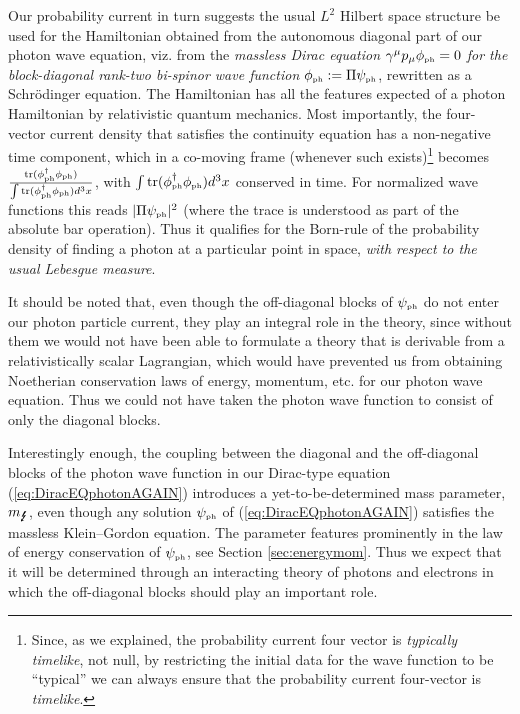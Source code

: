 \documentclass[11pt]{article}
\theoremstyle{definition}
\DeclareMathOperator{\tr}{tr}
\newcommand{\refeq}[1]{(\ref{#1})}
\numberwithin{equation}{section}
\newcommand{\psiPH}{{\psi_{\mbox{\rm\tiny ph}}}}
\newcommand{\phiPH}{{\phi_{\mbox{\rm\tiny ph}}}}
\newcommand{\mPH}{{m_{\mbox{\Lightning}}}}
\newcommand{\ga}{\gamma}
\begin{document}
 Our probability current in turn suggests the usual $L^2$ Hilbert space structure be used for the Hamiltonian obtained from the
autonomous diagonal part of our photon wave equation, viz. from the
\emph{massless Dirac equation $\ga^\mu p_\mu \phiPH = 0$ for the block-diagonal rank-two bi-spinor wave function} $\phiPH:= \Pi\psiPH$,
rewritten as a Schr\"odinger equation.
 The Hamiltonian has all the features expected of a photon Hamiltonian by relativistic quantum mechanics.
 Most importantly, the four-vector current density that satisfies the continuity equation has a non-negative time component,
which in a co-moving frame (whenever such exists)\footnote{Since, as we explained,
  the probability current four vector is \emph{typically timelike}, not null, by restricting the initial data for the 
  wave function to be ``typical'' we can always ensure that  the probability current four-vector is \emph{timelike}.}
becomes $\frac{\tr({\phi^\dagger_{\mbox{\rm\tiny ph}}} \phiPH)}{\int \tr({\phi^\dagger_{\mbox{\rm\tiny ph}}} \phiPH) d^3x}$, 
with $\int \tr({\phi^\dagger_{\mbox{\rm\tiny ph}}} \phiPH) d^3x$ conserved in time. 
 For normalized wave functions this reads $|\Pi\psiPH|^2$ (where the trace is understood as part of the absolute bar operation).
 Thus it qualifies for the Born-rule of the probability density of finding a photon at a particular point in space,
\emph{with respect to the usual Lebesgue measure}.

 It should be noted that, even though the off-diagonal blocks of $\psiPH$ do not enter our photon particle current, 
they play an integral role in the theory, since without them we would not have been able to formulate a theory that 
is derivable from a relativistically scalar Lagrangian, which would have prevented us from obtaining Noetherian 
conservation laws of energy, momentum, etc. for our photon wave equation. 
 Thus we could not have taken the photon wave function to consist of only the diagonal blocks. 

 Interestingly enough, the coupling between the diagonal and the off-diagonal blocks of the photon wave function
in our Dirac-type equation \refeq{eq:DiracEQphotonAGAIN} introduces a yet-to-be-determined mass parameter, $\mPH$, 
even though any solution $\psiPH$ of \refeq{eq:DiracEQphotonAGAIN} satisfies the massless Klein--Gordon equation. 
 The parameter features prominently in the law of energy conservation of $\psiPH$, see Section \ref{sec:energymom}. 
 Thus we expect that it will be determined through an interacting theory of photons and electrons in which the
off-diagonal blocks should play an important role.
\end{document}
